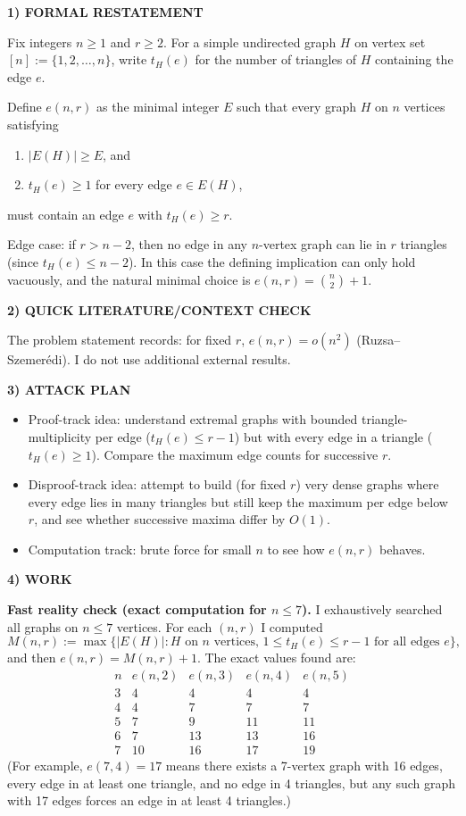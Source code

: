 \noindent\textbf{1) FORMAL RESTATEMENT}\par
Fix integers $n\ge 1$ and $r\ge 2$.
For a simple undirected graph $H$ on vertex set $[n]:=\{1,2,\dots,n\}$, write $t_H(e)$ for the number of triangles of $H$ containing the edge $e$.

Define $e(n,r)$ as the minimal integer $E$ such that every graph $H$ on $n$ vertices satisfying
\begin{enumerate}
\item $|E(H)|\ge E$, and
\item $t_H(e)\ge 1$ for every edge $e\in E(H)$,
\end{enumerate}
must contain an edge $e$ with $t_H(e)\ge r$.

Edge case: if $r>n-2$, then no edge in any $n$-vertex graph can lie in $r$ triangles (since $t_H(e)\le n-2$). In this case the defining implication can only hold vacuously, and the natural minimal choice is $e(n,r)={n\choose 2}+1$.

\noindent\textbf{2) QUICK LITERATURE/CONTEXT CHECK}\par
The problem statement records: for fixed $r$, $e(n,r)=o(n^2)$ (Ruzsa--Szemer\'{e}di). I do not use additional external results.

\noindent\textbf{3) ATTACK PLAN}\par
\begin{itemize}
\item Proof-track idea: understand extremal graphs with bounded triangle-multiplicity per edge ($t_H(e)\le r-1$) but with every edge in a triangle ($t_H(e)\ge 1$). Compare the maximum edge counts for successive $r$.
\item Disproof-track idea: attempt to build (for fixed $r$) very dense graphs where every edge lies in many triangles but still keep the maximum per edge below $r$, and see whether successive maxima differ by $O(1)$.
\item Computation track: brute force for small $n$ to see how $e(n,r)$ behaves.
\end{itemize}

\noindent\textbf{4) WORK}\par
\textbf{Fast reality check (exact computation for $n\le 7$).}
I exhaustively searched all graphs on $n\le 7$ vertices.
For each $(n,r)$ I computed
\[
M(n,r):=\max\{|E(H)|: H \text{ on } n \text{ vertices, } 1\le t_H(e)\le r-1 \text{ for all edges }e\},
\]
and then $e(n,r)=M(n,r)+1$.
The exact values found are:
\[
\begin{array}{c|cccc}
 n & e(n,2) & e(n,3) & e(n,4) & e(n,5) \\\hline
 3 & 4 & 4 & 4 & 4 \\
 4 & 4 & 7 & 7 & 7 \\
 5 & 7 & 9 & 11 & 11 \\
 6 & 7 & 13 & 13 & 16 \\
 7 & 10 & 16 & 17 & 19 
\end{array}
\]
(For example, $e(7,4)=17$ means there exists a 7-vertex graph with 16 edges, every edge in at least one triangle, and no edge in 4 triangles, but any such graph with 17 edges forces an edge in at least 4 triangles.)

